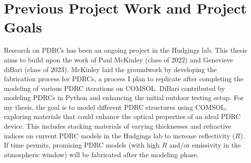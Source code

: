 \section{Previous Project Work and Project Goals}
Research on PDRCs has been an ongoing project in the Hudgings lab. This thesis aims to build upon the work of Paul McKinley (class of 2022) and Genevieve diBari (class of 2023). McKinley laid the groundwork by developing the fabrication process for PDRCs, a process I plan to replicate after completing the modeling of various PDRC iterations on COMSOL. DiBari contributed by modeling PDRCs in Python and enhancing the initial outdoor testing setup. For my thesis, the goal is to model different PDRC structures using COMSOL, exploring materials that could enhance the optical properties of an ideal PDRC device. This includes stacking materials of varying thicknesses and refractive indices on current PDRC models in the Hudgings lab to increase reflectivity ($R$). If time permits, promising PDRC models (with high $R$ and/or emissivity in the atmospheric window) will be fabricated after the modeling phase. %
